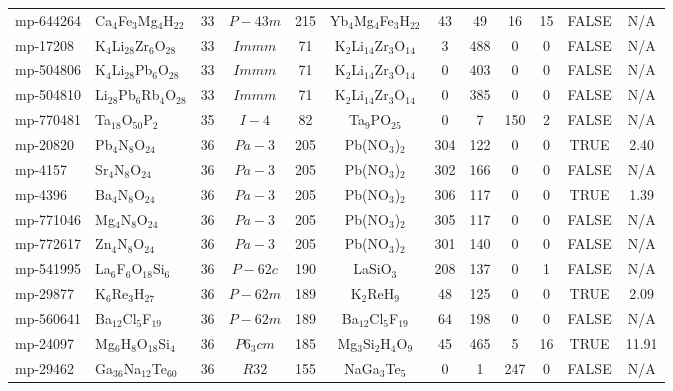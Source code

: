 {\begin{longtable}{llcccccccccc}
    mp-644264 & Ca$_{4}$Fe$_{3}$Mg$_{4}$H$_{22}$ & 33    & $P-43m$ & 215   & Yb$_{4}$Mg$_{4}$Fe$_{3}$H$_{22}$ & 43    & 49    & 16    & 15    & FALSE & N/A \\
    mp-17208 & K$_{4}$Li$_{28}$Zr$_{6}$O$_{28}$ & 33    & $Immm$ & 71    & K$_{2}$Li$_{14}$Zr$_{3}$O$_{14}$ & 3     & 488   & 0     & 0     & FALSE & N/A \\
    mp-504806 & K$_{4}$Li$_{28}$Pb$_{6}$O$_{28}$ & 33    & $Immm$ & 71    & K$_{2}$Li$_{14}$Zr$_{3}$O$_{14}$ & 0     & 403   & 0     & 0     & FALSE & N/A \\
    mp-504810 & Li$_{28}$Pb$_{6}$Rb$_{4}$O$_{28}$ & 33    & $Immm$ & 71    & K$_{2}$Li$_{14}$Zr$_{3}$O$_{14}$ & 0     & 385   & 0     & 0     & FALSE & N/A \\
    mp-770481 & Ta$_{18}$O$_{50}$P$_{2}$ & 35    & $I-4$ & 82    & Ta$_{9}$PO$_{25}$ & 0     & 7     & 150   & 2     & FALSE & N/A \\
    mp-20820 & Pb$_{4}$N$_{8}$O$_{24}$ & 36    & $Pa-3$ & 205   & Pb(NO$_{3}$)$_{2}$ & 304   & 122   & 0     & 0     & TRUE  & 2.40  \\
    mp-4157 & Sr$_{4}$N$_{8}$O$_{24}$ & 36    & $Pa-3$ & 205   & Pb(NO$_{3}$)$_{2}$ & 302   & 166   & 0     & 0     & FALSE & N/A \\
    mp-4396 & Ba$_{4}$N$_{8}$O$_{24}$ & 36    & $Pa-3$ & 205   & Pb(NO$_{3}$)$_{2}$ & 306   & 117   & 0     & 0     & TRUE  & 1.39  \\
    mp-771046 & Mg$_{4}$N$_{8}$O$_{24}$ & 36    & $Pa-3$ & 205   & Pb(NO$_{3}$)$_{2}$ & 305   & 117   & 0     & 0     & FALSE & N/A \\
    mp-772617 & Zn$_{4}$N$_{8}$O$_{24}$ & 36    & $Pa-3$ & 205   & Pb(NO$_{3}$)$_{2}$ & 301   & 140   & 0     & 0     & FALSE & N/A \\
    mp-541995 & La$_{6}$F$_{6}$O$_{18}$Si$_{6}$ & 36    & $P-62c$ & 190   & LaSiO$_{3}$ & 208   & 137   & 0     & 1     & FALSE & N/A \\
    mp-29877 & K$_{6}$Re$_{3}$H$_{27}$ & 36    & $P-62m$ & 189   & K$_{2}$ReH$_{9}$ & 48    & 125   & 0     & 0     & TRUE  & 2.09  \\
    mp-560641 & Ba$_{12}$Cl$_{5}$F$_{19}$ & 36    & $P-62m$ & 189   & Ba$_{12}$Cl$_{5}$F$_{19}$ & 64    & 198   & 0     & 0     & FALSE & N/A \\
    mp-24097 & Mg$_{6}$H$_{8}$O$_{18}$Si$_{4}$ & 36    & $P6_3cm$ & 185   & Mg$_{3}$Si$_{2}$H$_{4}$O$_{9}$ & 45    & 465   & 5     & 16    & TRUE  & 11.91  \\
    mp-29462 & Ga$_{36}$Na$_{12}$Te$_{60}$ & 36    & $R32$ & 155   & NaGa$_{3}$Te$_{5}$ & 0     & 1     & 247   & 0     & FALSE & N/A \\

\end{longtable}}
